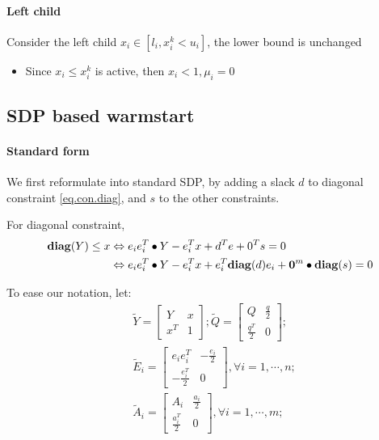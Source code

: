 \documentclass[../main]{subfiles}
\begin{document}
\paragraph{Left child}
Consider the left child \(x_i \in [l_i, x_i^k < u_i]\), the lower bound is unchanged
\begin{itemize}
    \item Since \(x_i \le x_i^k\) is active, then \(x_i < 1, \mu_i = 0\)
\end{itemize}

\subsection{SDP based warmstart}

\paragraph{Standard form}
We first reformulate into standard SDP, by adding a slack \(d\) to diagonal constraint \eqref{eq.con.diag}, and \(s\) to the other constraints.


For diagonal constraint,
\begin{align*}
    \mathbf{diag}(Y) \le x & \Leftrightarrow e_ie_i^T \bullet Y - e_i^T x + d^Te + 0^Ts = 0                                 \\
                   & \Leftrightarrow e_ie_i^T \bullet Y - e_i^T x + e_i^T\mathbf{diag}(d)e_i + \bm 0^m \bullet \mathbf{diag}(s) = 0
\end{align*}

To ease our notation, let:
\begin{align*}
     & \tilde Y = \begin{bmatrix} Y             & x \\ x^T & 1 \end{bmatrix}; \tilde Q = \begin{bmatrix} Q & \frac{q}{2} \\ \frac{q^T}{2} & 0 \end{bmatrix} ; \\
     & \tilde E_i = \begin{bmatrix} e_ie_i^T  & -\frac{e_i}{2} \\ -\frac{e_i^T}{2} & 0 \end{bmatrix}, \forall i=1,\cdots,n;                 \\
     & \tilde A_i = \begin{bmatrix} A_i             & \frac{a_i}{2} \\ \frac{a_i^T}{2} & 0 \end{bmatrix}, \forall i=1,\cdots,m;
\end{align*}
\end{document}
